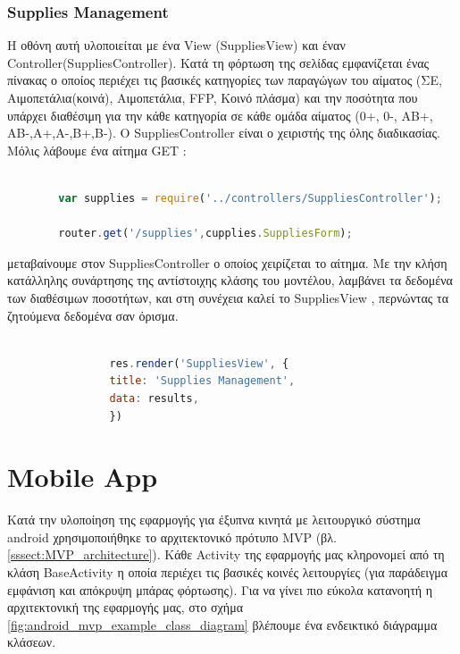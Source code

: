 		\subsubsection{Supplies Management}
		
	Η οθόνη αυτή υλοποιείται με ένα View (SuppliesView) και έναν Controller(SuppliesController). Κατά τη φόρτωση της σελίδας εμφανίζεται ένας πίνακας ο οποίος περιέχει τις βασικές κατηγορίες των παραγώγων του αίματος (ΣΕ, Αιμοπετάλια(κοινά), Αιμοπετάλια, FFP, Κοινό πλάσμα) και την ποσότητα που υπάρχει διαθέσιμη για την κάθε κατηγορία σε κάθε ομάδα αίματος (0+, 0-, ΑΒ+, ΑΒ-,Α+,Α-,Β+,Β-). O SuppliesController είναι ο χειριστής της όλης διαδικασίας. Μόλις λάβουμε ένα αίτημα GET :
		
		\begin{lstlisting}[language=Javascript]			
		
		var supplies = require('../controllers/SuppliesController');
		
		router.get('/supplies',cupplies.SuppliesForm);  


		\end{lstlisting}
		
μεταβαίνουμε στον SuppliesController ο οποίος χειρίζεται το αίτημα. Με την κλήση κατάλληλης συνάρτησης της αντίστοιχης κλάσης του μοντέλου, λαμβάνει τα δεδομένα των διαθέσιμων ποσοτήτων,  και στη συνέχεια καλεί το SuppliesView , περνώντας τα ζητούμενα δεδομένα σαν όρισμα.



		\begin{lstlisting}[language=Javascript]			
		
	            res.render('SuppliesView', { 
                title: 'Supplies Management',
                data: results,
				})

		\end{lstlisting}
	

\section{Mobile App}
	Κατά την υλοποίηση της εφαρμογής για έξυπνα κινητά με λειτουργικό σύστημα android χρησιμοποιήθηκε το αρχιτεκτονικό πρότυπο MVP (βλ. \ref{sssect:MVP_architecture}). Κάθε Activity της εφαρμογής μας κληρονομεί από τη κλάση BaseActivity η οποία περιέχει τις βασικές κοινές λειτουργίες (για παράδειγμα εμφάνιση και απόκρυψη μπάρας φόρτωσης). Για να γίνει πιο εύκολα κατανοητή η αρχιτεκτονική της εφαρμογής μας, στο σχήμα \ref{fig:android_mvp_example_class_diagram} βλέπουμε ένα ενδεικτικό διάγραμμα κλάσεων.
	
